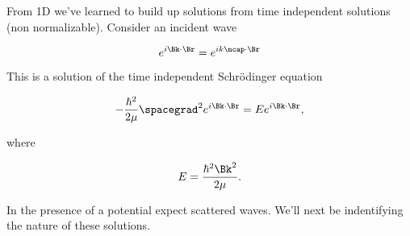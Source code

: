 From 1D we've learned to build up solutions from time independent solutions (non normalizable).  Consider an incident wave

\begin{equation}\label{eqn:qmTwoL22:510}
e^{i \Bk \cdot \Br} = e^{i k \ncap \cdot \Br}
\end{equation}

This is a solution of the time independent Schr\"{o}dinger equation

\begin{equation}\label{eqn:qmTwoL22:530}
-\frac{\hbar^2}{2 \mu} \spacegrad^2 e^{i \Bk \cdot \Br} 
= E
e^{i \Bk \cdot \Br},
\end{equation}

where

\begin{equation}\label{eqn:qmTwoL22:550}
E = \frac{\hbar^2 \Bk^2}{2 \mu}.
\end{equation}

In the presence of a potential expect scattered waves.  We'll next be indentifying the nature of these solutions.

\EndArticle
